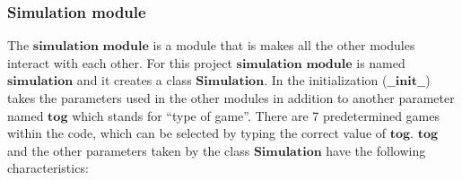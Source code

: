 \documentclass{book}
\begin{document}
\subsubsection{Simulation module}
The $\textbf{simulation module}$ is a module that is makes all the other modules interact with each other. For this project $\textbf{simulation module}$ is named $\textbf{simulation}$  and it creates a class $\textbf{Simulation}$. In the initialization ($\textbf{\_\_init\_\_}$) takes the parameters used in the other modules in addition to another parameter named $\textbf{tog}$ which stands for ``type of game''. There are 7 predetermined games within the code, which can be selected by typing the correct value of $\textbf{tog}$. $\textbf{tog}$ and the other parameters taken by the class $\textbf{Simulation}$ have the following characteristics:
\end{document}
